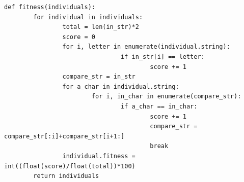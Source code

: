 \documentclass[12pt]{article}
\begin{document}
\begin{lstlisting}[caption = {Fitness Function}]
def fitness(individuals):
        for individual in individuals:
                total = len(in_str)*2
                score = 0
                for i, letter in enumerate(individual.string):
                                if in_str[i] == letter:
                                        score += 1
                compare_str = in_str
                for a_char in individual.string:
                        for i, in_char in enumerate(compare_str):
                                if a_char == in_char:
                                        score += 1
                                        compare_str = compare_str[:i]+compare_str[i+1:]
                                        break
                individual.fitness = int((float(score)/float(total))*100)                          
        return individuals
\end{lstlisting}
\end{document}
